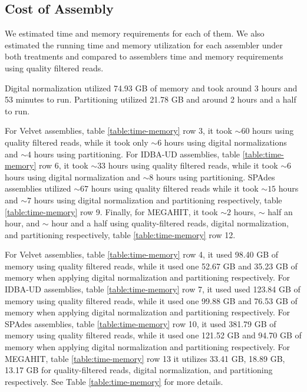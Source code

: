 \subsection*{Cost of Assembly} 
We estimated time and memory requirements for each of them. We also estimated the running time and memory utilization for each assembler under both treatments and compared to assemblers time and memory requirements using quality filtered reads.  

Digital normalization utilized 74.93 GB of memory and took around 3
hours and 53 minutes to run. Partitioning utilized 21.78 GB and around
2 hours and a half to run. %

For Velvet assemblies, table \ref{table:time-memory} row 3, it took $\sim 60$ hours using quality filtered reads, while it took only $\sim 6$ hours using digital normalizations
and $\sim 4$ hours using partitioning.  For IDBA-UD assemblies, table \ref{table:time-memory} row 6, it took $\sim 33$ hours using quality filtered reads, while it took $\sim 6$
hours using digital normalization and $\sim 8$ hours using
partitioning.  SPAdes assemblies utilized $\sim 67$ hours using quality
filtered reads while it took $\sim15$ hours and $\sim 7$ hours using
digital normalization and partitioning respectively, table \ref{table:time-memory} row 9. Finally, for
MEGAHIT, it took $\sim 2$ hours, $\sim$ half an hour, and $\sim$ hour
and a half using quality-filtered reads, digital normalization, and
partitioning respectively, table \ref{table:time-memory} row 12.
 
For Velvet assemblies, table \ref{table:time-memory} row 4, it used 98.40 GB of memory using quality
filtered reads, while it used one 52.67 GB and 35.23 GB of memory when
applying digital normalization and partitioning respectively. For IDBA-UD
assemblies, table \ref{table:time-memory} row 7, it used used 123.84 GB of memory using quality filtered
reads, while it used one 99.88 GB and 76.53 GB of memory when applying
digital normalization and partitioning respectively. For SPAdes
assemblies, table \ref{table:time-memory} row 10, it used 381.79 GB of memory using quality filtered reads,
while it used one 121.52 GB and 94.70 GB of memory when applying
digital normalization and partitioning respectively.  For MEGAHIT, table \ref{table:time-memory} row 13 it
utilizes 33.41 GB, 18.89 GB, 13.17 GB for quality-filtered reads,
digital normalization, and partitioning respectively. See Table
\ref{table:time-memory} for more details. 


